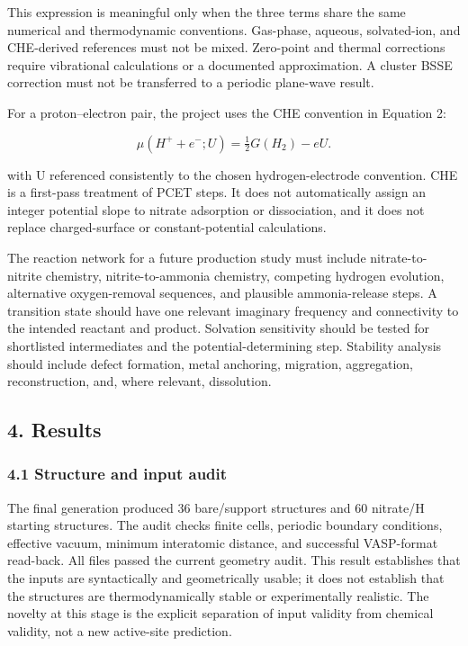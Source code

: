 \documentclass[
]{article}
\begin{document}
This expression is meaningful only when the three terms share the same
numerical and thermodynamic conventions. Gas-phase, aqueous,
solvated-ion, and CHE-derived references must not be mixed. Zero-point
and thermal corrections require vibrational calculations or a documented
approximation. A cluster BSSE correction must not be transferred to a
periodic plane-wave result.

For a proton--electron pair, the project uses the CHE convention in
Equation 2:

\[
\mu(H^+ + e^-;U)=\tfrac{1}{2}G(H_2)-eU. \tag{2}
\]

with U referenced consistently to the chosen hydrogen-electrode
convention. CHE is a first-pass treatment of PCET steps. It does not
automatically assign an integer potential slope to nitrate adsorption or
dissociation, and it does not replace charged-surface or
constant-potential calculations.

The reaction network for a future production study must include
nitrate-to-nitrite chemistry, nitrite-to-ammonia chemistry, competing
hydrogen evolution, alternative oxygen-removal sequences, and plausible
ammonia-release steps. A transition state should have one relevant
imaginary frequency and connectivity to the intended reactant and
product. Solvation sensitivity should be tested for shortlisted
intermediates and the potential-determining step. Stability analysis
should include defect formation, metal anchoring, migration,
aggregation, reconstruction, and, where relevant, dissolution.

\hypertarget{results}{%
\subsection{4. Results}\label{results}}

\hypertarget{structure-and-input-audit}{%
\subsubsection{4.1 Structure and input
audit}\label{structure-and-input-audit}}

The final generation produced 36 bare/support structures and 60
nitrate/H starting structures. The audit checks finite cells, periodic
boundary conditions, effective vacuum, minimum interatomic distance, and
successful VASP-format read-back. All files passed the current geometry
audit. This result establishes that the inputs are syntactically and
geometrically usable; it does not establish that the structures are
thermodynamically stable or experimentally realistic. The novelty at
this stage is the explicit separation of input validity from chemical
validity, not a new active-site prediction.
\end{document}

